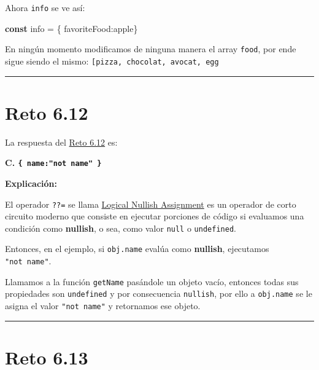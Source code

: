 \documentclass[
  letterpaper,
  DIV=11,
  numbers=noendperiod]{scrreprt}
\newenvironment{Shaded}{\begin{snugshade}}{\end{snugshade}}
\newcommand{\DataTypeTok}[1]{\textcolor[rgb]{0.68,0.00,0.00}{#1}}
\newcommand{\KeywordTok}[1]{\textcolor[rgb]{0.00,0.23,0.31}{\textbf{#1}}}
\newcommand{\NormalTok}[1]{\textcolor[rgb]{0.00,0.23,0.31}{#1}}
\newcommand{\OperatorTok}[1]{\textcolor[rgb]{0.37,0.37,0.37}{#1}}
\newcommand{\StringTok}[1]{\textcolor[rgb]{0.13,0.47,0.30}{#1}}
\begin{document}
Ahora \texttt{info} se ve así:

\begin{Shaded}
\begin{Highlighting}[]
\KeywordTok{const}\NormalTok{ info }\OperatorTok{=}\NormalTok{ \{ }\DataTypeTok{favoriteFood}\OperatorTok{:}\StringTok{\textquotesingle{}apple\textquotesingle{}}\NormalTok{\}}
\end{Highlighting}
\end{Shaded}

En ningún momento modificamos de ninguna manera el array \texttt{food},
por ende sigue siendo el mismo:
\texttt{{[}\textquotesingle{}pizza\textquotesingle{},\ \textquotesingle{}chocolat\textquotesingle{},\ \textquotesingle{}avocat\textquotesingle{},\ \textquotesingle{}egg\textquotesingle{}{]}}

\begin{center}\rule{0.5\linewidth}{0.5pt}\end{center}

\section{Reto 6.12}\label{sec-sol-cap6-reto12}

La respuesta del \hyperref[sec-cap6-reto12]{Reto 6.12} es:

\textbf{C. \texttt{\{\ name:"not\ name"\ \}}}

\textbf{Explicación:}

El operador \texttt{??=} se llama
\hyperref[glos-logical-nullish-assignment]{Logical Nullish Assignment}
es un operador de corto circuito moderno que consiste en ejecutar
porciones de código si evaluamos una condición como \textbf{nullish}, o
sea, como valor \texttt{null} o \texttt{undefined}.

Entonces, en el ejemplo, si \texttt{obj.name} evalúa como
\textbf{nullish}, ejecutamos \texttt{"not\ name"}.

Llamamos a la función \texttt{getName} pasándole un objeto vacío,
entonces todas sus propiedades son \texttt{undefined} y por consecuencia
\texttt{nullish}, por ello a \texttt{obj.name} se le asigna el valor
\texttt{"not\ name"} y retornamos ese objeto.

\begin{center}\rule{0.5\linewidth}{0.5pt}\end{center}

\section{Reto 6.13}\label{sec-sol-cap6-reto13}
\end{document}
